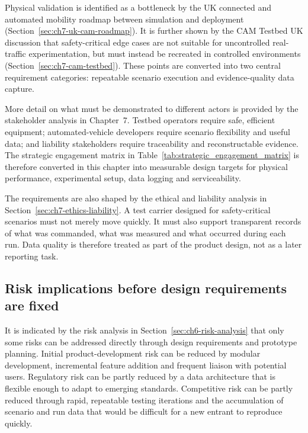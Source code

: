 Physical validation is identified as a bottleneck by the UK connected and automated mobility roadmap between simulation and deployment (Section~\ref{sec:ch7-uk-cam-roadmap}). It is further shown by the CAM Testbed UK discussion that safety-critical edge cases are not suitable for uncontrolled real-traffic experimentation, but must instead be recreated in controlled environments (Section~\ref{sec:ch7-cam-testbed}). These points are converted into two central requirement categories: repeatable scenario execution and evidence-quality data capture.

More detail on what must be demonstrated to different actors is provided by the stakeholder analysis in Chapter~7. Testbed operators require safe, efficient equipment; automated-vehicle developers require scenario flexibility and useful data; and liability stakeholders require traceability and reconstructable evidence. The strategic engagement matrix in Table~\ref{tab:strategic_engagement_matrix} is therefore converted in this chapter into measurable design targets for physical performance, experimental setup, data logging and serviceability.

The requirements are also shaped by the ethical and liability analysis in Section~\ref{sec:ch7-ethics-liability}. A test carrier designed for safety-critical scenarios must not merely move quickly. It must also support transparent records of what was commanded, what was measured and what occurred during each run. Data quality is therefore treated as part of the product design, not as a later reporting task.

\subsection{Risk implications before design requirements are fixed}
\label{sec:ch8_risk_implications_before_requirements}

It is indicated by the risk analysis in Section~\ref{sec:ch6-risk-analysis} that only some risks can be addressed directly through design requirements and prototype planning. Initial product-development risk can be reduced by modular development, incremental feature addition and frequent liaison with potential users. Regulatory risk can be partly reduced by a data architecture that is flexible enough to adapt to emerging standards. Competitive risk can be partly reduced through rapid, repeatable testing iterations and the accumulation of scenario and run data that would be difficult for a new entrant to reproduce quickly.

